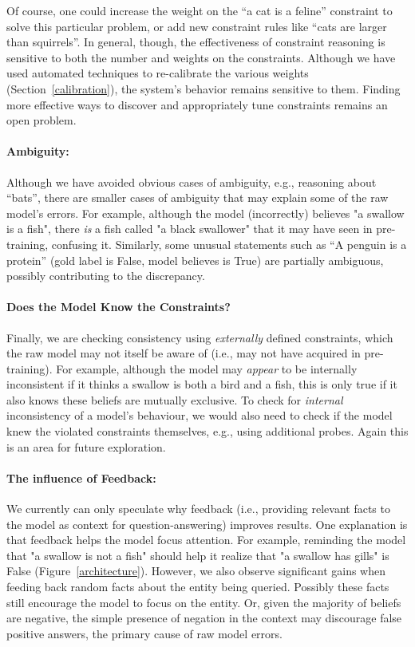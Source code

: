 \documentclass[11pt]{article}
\begin{document}
Of course, one could increase the weight on the ``a cat is a feline'' constraint
to solve this particular problem, or add new constraint rules like ``cats are larger than squirrels''. In general, though,
the effectiveness of constraint reasoning is sensitive to both the number
and weights on the constraints. Although we have used automated techniques
to re-calibrate the various weights (Section~\ref{calibration}), the system's
behavior remains sensitive to them. Finding more effective ways to discover and
appropriately tune constraints remains an open problem.

\paragraph{Ambiguity:} Although we have avoided obvious cases of ambiguity, e.g., reasoning
about ``bats'', there are smaller cases of ambiguity that may explain some of the raw
model's errors. For example, although the model (incorrectly) believes "a swallow is a fish",
there {\it is} a fish called "a black swallower" that it may have seen in pre-training,
confusing it. Similarly, some unusual statements such as ``A penguin is a protein''
(gold label is False, model believes is True) are partially ambiguous, possibly
contributing to the discrepancy.

\paragraph{Does the Model Know the Constraints?} 
Finally, we are checking consistency using {\it externally} defined constraints,
which the raw model may not itself be aware of (i.e., may not have acquired in pre-training). 
For example, although the model may {\it appear} to be internally inconsistent if it thinks a swallow is both a bird 
and a fish, this is only true if it also knows these beliefs are mutually exclusive.
To check for {\it internal} inconsistency of a model's behaviour, we would also need to
check if the model knew the violated constraints themselves, e.g., using additional probes.
Again this is an area for future exploration.

\paragraph{The influence of Feedback:} We currently can only speculate why feedback (i.e., providing relevant
facts to the model as context for question-answering) improves results. One explanation is that
feedback helps the model focus attention. For example, reminding the model that "a swallow is not
a fish" should help it realize that "a swallow has gills" is False (Figure~\ref{architecture}).
However, we also observe significant gains when feeding back random facts about the entity
being queried. Possibly these facts still encourage the model to focus on the entity. Or,
given the majority of beliefs are negative, the simple presence of negation in the context
may discourage false positive answers, the primary cause of raw model errors.
\end{document}
